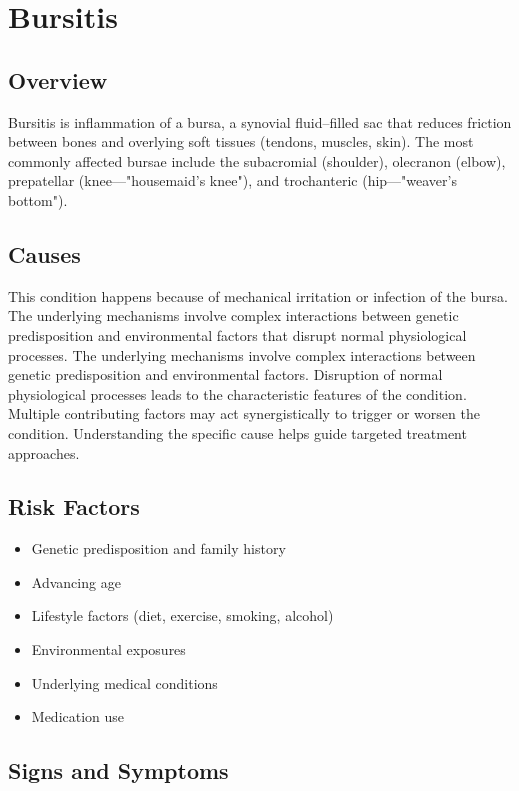\chapter{Bursitis}
\label{sec:Bursitis}

\section{Overview}
Bursitis is inflammation of a bursa, a synovial fluid--filled sac that reduces friction between bones and overlying soft tissues (tendons, muscles, skin). The most commonly affected bursae include the subacromial (shoulder), olecranon (elbow), prepatellar (knee---"housemaid's knee"), and trochanteric (hip---"weaver's bottom").
\section{Causes}
This condition happens because of mechanical irritation or infection of the bursa. The underlying mechanisms involve complex interactions between genetic predisposition and environmental factors that disrupt normal physiological processes. The underlying mechanisms involve complex interactions between genetic predisposition and environmental factors. Disruption of normal physiological processes leads to the characteristic features of the condition. Multiple contributing factors may act synergistically to trigger or worsen the condition. Understanding the specific cause helps guide targeted treatment approaches.
\section{Risk Factors}


\begin{itemize}[noitemsep]
  \item Genetic predisposition and family history
  \item Advancing age
  \item Lifestyle factors (diet, exercise, smoking, alcohol)
  \item Environmental exposures
  \item Underlying medical conditions
  \item Medication use
\end{itemize}
\section{Signs and Symptoms}

